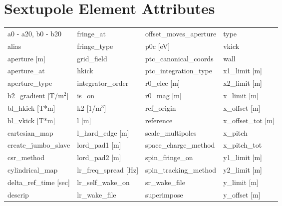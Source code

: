  \section{Sextupole Element Attributes}
 \label{s:list.sextupole}
 
 \begin{tabular}{llll} \toprule
a0 - a20, b0 - b20             & fringe_at                      & offset_moves_aperture          & type                           \\
alias                          & fringe_type                    & p0c [eV]                       & vkick                          \\
aperture [m]                   & grid_field                     & ptc_canonical_coords           & wall                           \\
aperture_at                    & hkick                          & ptc_integration_type           & x1_limit [m]                   \\
aperture_type                  & integrator_order               & r0_elec [m]                    & x2_limit [m]                   \\
b2_gradient [T/m$^2$]          & is_on                          & r0_mag [m]                     & x_limit [m]                    \\
bl_hkick [T*m]                 & k2 [1/m$^3$]                   & ref_origin                     & x_offset [m]                   \\
bl_vkick [T*m]                 & l [m]                          & reference                      & x_offset_tot [m]               \\
cartesian_map                  & l_hard_edge [m]                & scale_multipoles               & x_pitch                        \\
create_jumbo_slave             & lord_pad1 [m]                  & space_charge_method            & x_pitch_tot                    \\
csr_method                     & lord_pad2 [m]                  & spin_fringe_on                 & y1_limit [m]                   \\
cylindrical_map                & lr_freq_spread [Hz]            & spin_tracking_method           & y2_limit [m]                   \\
delta_ref_time [sec]           & lr_self_wake_on                & sr_wake_file                   & y_limit [m]                    \\
descrip                        & lr_wake_file                   & superimpose                    & y_offset [m]                   \\

\end{tabular}
